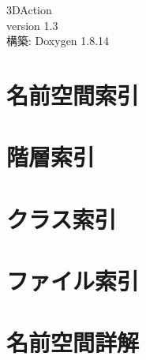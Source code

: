 \documentclass[twoside]{book}
\newcommand{\+}{\discretionary{\mbox{\scriptsize$\hookleftarrow$}}{}{}}
\newcommand{\clearemptydoublepage}{%
  \newpage{\pagestyle{empty}\cleardoublepage}%
}
\begin{document}
\hypersetup{pageanchor=false,
             bookmarksnumbered=true,
             pdfencoding=unicode
            }
\begin{titlepage}
\vspace*{7cm}
\begin{center}%
{\Large 3\+D\+Action \\[1ex]\large version 1.\+3 }\\
\vspace*{1cm}
{\large 構築\+: Doxygen 1.8.14}\\
\end{center}
\end{titlepage}
\clearemptydoublepage
{}
\tableofcontents
\clearemptydoublepage
{}
\hypersetup{pageanchor=true}

\chapter{名前空間索引}

\chapter{階層索引}

\chapter{クラス索引}

\chapter{ファイル索引}

\chapter{名前空間詳解}







\end{document}

